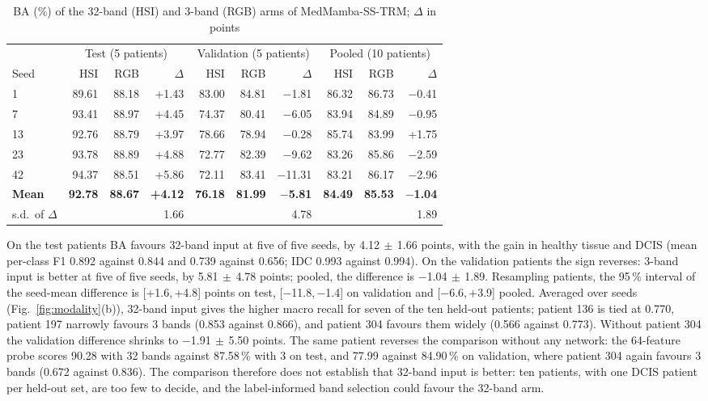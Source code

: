 \documentclass{svproc}
\newcommand{\ms}{\ensuremath{\,\pm\,}}   %
\begin{document}
\begin{table}[t]
\caption{BA (\%) of the 32-band (HSI) and 3-band (RGB) arms of MedMamba-SS-TRM; $\Delta$ in points}
\label{tab:modality}
\centering\scriptsize
\setlength{\tabcolsep}{4pt}
\begin{tabular}{@{}lrrrrrrrrr@{}}
\toprule
& \multicolumn{3}{c}{Test (5 patients)} & \multicolumn{3}{c}{Validation (5 patients)} & \multicolumn{3}{c}{Pooled (10 patients)} \\
\cmidrule(lr){2-4}\cmidrule(lr){5-7}\cmidrule(l){8-10}
Seed & HSI & RGB & $\Delta$ & HSI & RGB & $\Delta$ & HSI & RGB & $\Delta$ \\
\midrule
1 & 89.61 & 88.18 & +1.43 & 83.00 & 84.81 & $-$1.81 & 86.32 & 86.73 & $-$0.41 \\
7 & 93.41 & 88.97 & +4.45 & 74.37 & 80.41 & $-$6.05 & 83.94 & 84.89 & $-$0.95 \\
13 & 92.76 & 88.79 & +3.97 & 78.66 & 78.94 & $-$0.28 & 85.74 & 83.99 & +1.75 \\
23 & 93.78 & 88.89 & +4.88 & 72.77 & 82.39 & $-$9.62 & 83.26 & 85.86 & $-$2.59 \\
42 & 94.37 & 88.51 & +5.86 & 72.11 & 83.41 & $-$11.31 & 83.21 & 86.17 & $-$2.96 \\
\textbf{Mean} & \textbf{92.78} & \textbf{88.67} & \textbf{+4.12} & \textbf{76.18} & \textbf{81.99} & \textbf{$-$5.81} & \textbf{84.49} & \textbf{85.53} & \textbf{$-$1.04} \\
s.d.\ of $\Delta$ & & & 1.66 & & & 4.78 & & & 1.89 \\
\bottomrule
\end{tabular}
\end{table}

On the test patients BA favours 32-band input at five of five seeds, by 4.12\ms1.66 points, with the gain in healthy tissue and DCIS (mean per-class F1 0.892 against 0.844 and 0.739 against 0.656; IDC 0.993 against 0.994). On the validation patients the sign reverses: 3-band input is better at five of five seeds, by 5.81\ms4.78 points; pooled, the difference is $-$1.04\ms1.89. Resampling patients, the 95\,\% interval of the seed-mean difference is [+1.6,\,+4.8] points on test, [$-$11.8,\,$-$1.4] on validation and [$-$6.6,\,+3.9] pooled. Averaged over seeds (Fig.~\ref{fig:modality}(b)), 32-band input gives the higher macro recall for seven of the ten held-out patients; patient 136 is tied at 0.770, patient 197 narrowly favours 3 bands (0.853 against 0.866), and patient 304 favours them widely (0.566 against 0.773). Without patient 304 the validation difference shrinks to $-$1.91\ms5.50 points. The same patient reverses the comparison without any network: the 64-feature probe scores 90.28 with 32 bands against 87.58\,\% with 3 on test, and 77.99 against 84.90\,\% on validation, where patient 304 again favours 3 bands (0.672 against 0.836). The comparison therefore does not establish that 32-band input is better: ten patients, with one DCIS patient per held-out set, are too few to decide, and the label-informed band selection could favour the 32-band arm.
\end{document}
